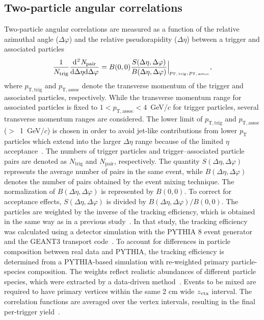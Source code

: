 \subsection{Two-particle angular correlations}
Two-particle angular correlations are measured as a function of the relative azimuthal angle ($\Delta\varphi$) and the relative pseudorapidity ($\Delta\eta$) between a trigger and associated particles
\begin{eqnarray}
\frac{1}{N_{\rm{trig}}} \frac{ \rm{d}\it{}^{2} N_{\rm{pair}} }{ \rm{d} \Delta\eta \rm{d}\Delta\varphi} = B(0, 0)\frac{S(\Delta\eta, \Delta\varphi)}{B(\Delta\eta, \Delta\varphi)}  \Big\lvert_{p_\mathrm{T,\,trig},\,p_\mathrm{T,\,assoc}},
\label{eq:corrfunction}
\end{eqnarray}
where $p_\mathrm{T,trig}$ and $p_\mathrm{T,assoc}$ denote the transverse momentum of the trigger and associated particles, respectively.
While the transverse momentum range for associated particles is fixed to $1<p_\mathrm{T,assoc}<4$~GeV/$c$ for trigger particles, several transverse momentum ranges are considered. The lower limit of $p_\mathrm{T,trig}$ and $p_\mathrm{T,assoc}$ ($>$~1~GeV/$c$) is chosen in order to avoid jet-like contributions from lower $p_\mathrm{T}$ particles which extend into the larger $\Delta\eta$ range because of the limited $\eta$ acceptance~\cite{ALICE:2021nir}. The numbers of trigger particles and trigger--associated particle pairs are denoted as $N_\mathrm{trig}$ and $N_\mathrm{pair}$, respectively.
The quantity $S(\Delta\eta, \Delta\varphi)$ represents the average number of pairs in the same event, while $B(\Delta\eta, \Delta\varphi)$ denotes the number of pairs obtained by the event mixing technique. The normalization of $B(\Delta\eta, \Delta\varphi)$ is represented by $B(0,0)$. To correct for acceptance effects, $S(\Delta\eta, \Delta\varphi)$ is divided by $B(\Delta\eta, \Delta\varphi)/B(0,0)$. The particles are weighted by the inverse of the tracking efficiency, which is obtained in the same way as in a previous study~\cite{ALICE:2021nir}. In that study, the tracking efficiency was calculated using a detector simulation with the PYTHIA 8 event generator and the GEANT3 transport code~\cite{Brun:1994aa}. To account for differences in particle composition between real data and PYTHIA, the tracking efficiency is determined from a PYTHIA-based simulation with re-weighted primary particle-species composition.
The weights reflect realistic abundances of different particle species, which were extracted by a data-driven method~\cite{ALICE:2018hza, ALICE:2018vuu}.
Events to be mixed are required to have primary vertices within the same 2 cm wide $z_{\rm vtx}$ interval. The correlation functions are averaged over the vertex intervals, resulting in the final per-trigger yield~\cite{Kopylov:1974th,Adam:2016tsv}. 

